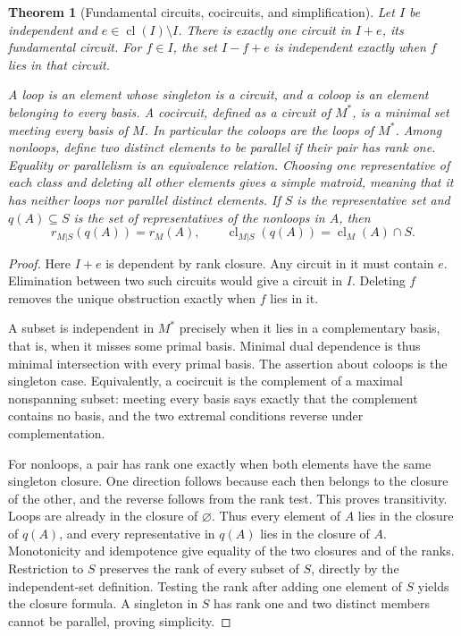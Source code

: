 \documentclass[11pt,oneside,openany]{book}
\theoremstyle{plain}
\newtheorem{theorem}{Theorem}[chapter]
\theoremstyle{definition}
\theoremstyle{remark}
\begin{document}
\begin{theorem}[Fundamental circuits, cocircuits, and simplification]
\label{p204:W68}
Let \(I\) be independent and \(e\in\operatorname{cl}(I)\setminus I\).
There is exactly one circuit in \(I+e\), its \emph{fundamental
circuit}. For \(f\in I\), the set \(I-f+e\) is independent
exactly when \(f\) lies in that circuit.

A loop is an element whose singleton is a circuit, and a
coloop is an element belonging to every basis. A cocircuit,
defined as a circuit of \(M^*\), is a minimal set meeting
every basis of \(M\). In particular the coloops are the loops
of \(M^*\). Among nonloops, define two distinct elements to
be parallel if their pair has rank one. Equality or parallelism
is an equivalence relation. Choosing one representative of
each class and deleting all other elements gives a simple
matroid, meaning that it has neither loops nor parallel
distinct elements. If \(S\) is the representative set and
\(q(A)\subseteq S\) is the set of representatives of the
nonloops in \(A\), then
\[
 r_{M|S}(q(A))=r_M(A),\qquad
 \operatorname{cl}_{M|S}(q(A))=\operatorname{cl}_M(A)\cap S .
\]
\end{theorem}

\begin{proof}
Here \(I+e\) is dependent by rank closure. Any circuit in it
must contain \(e\). Elimination between two such circuits
would give a circuit in \(I\). Deleting \(f\) removes the
unique obstruction exactly when \(f\) lies in it.

A subset is independent in \(M^*\) precisely when it lies in
a complementary basis, that is, when it misses some primal
basis. Minimal dual dependence is thus minimal intersection
with every primal basis. The assertion about coloops is the
singleton case. Equivalently, a cocircuit is the complement
of a maximal nonspanning subset: meeting every basis says
exactly that the complement contains no basis, and the two
extremal conditions reverse under complementation.

For nonloops, a pair has rank one exactly when both elements
have the same singleton closure. One direction follows
because each then belongs to the closure of the other, and
the reverse follows from the rank test. This proves
transitivity. Loops are already in the closure of
\(\varnothing\). Thus every element of \(A\) lies in the
closure of \(q(A)\), and every representative in \(q(A)\)
lies in the closure of \(A\). Monotonicity and idempotence
give equality of the two closures and of the ranks.
Restriction to \(S\) preserves the rank of every subset of
\(S\), directly by the independent-set definition. Testing
the rank after adding one element of \(S\) yields the closure
formula. A singleton in \(S\) has rank one and two distinct
members cannot be parallel, proving simplicity.
\end{proof}
\end{document}
